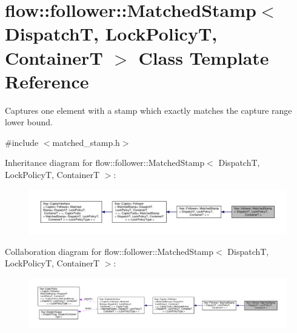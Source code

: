 \hypertarget{classflow_1_1follower_1_1_matched_stamp}{}\section{flow\+:\+:follower\+:\+:Matched\+Stamp$<$ DispatchT, Lock\+PolicyT, ContainerT $>$ Class Template Reference}
\label{classflow_1_1follower_1_1_matched_stamp}


Captures one element with a stamp which exactly matches the capture range lower bound.  




{\ttfamily \#include $<$matched\+\_\+stamp.\+h$>$}



Inheritance diagram for flow\+:\+:follower\+:\+:Matched\+Stamp$<$ DispatchT, Lock\+PolicyT, ContainerT $>$\+:\nopagebreak
\begin{figure}[H]
\begin{center}
\leavevmode
\includegraphics[width=350pt]{classflow_1_1follower_1_1_matched_stamp__inherit__graph}
\end{center}
\end{figure}


Collaboration diagram for flow\+:\+:follower\+:\+:Matched\+Stamp$<$ DispatchT, Lock\+PolicyT, ContainerT $>$\+:\nopagebreak
\begin{figure}[H]
\begin{center}
\leavevmode
\includegraphics[width=350pt]{classflow_1_1follower_1_1_matched_stamp__coll__graph}
\end{center}
\end{figure}
